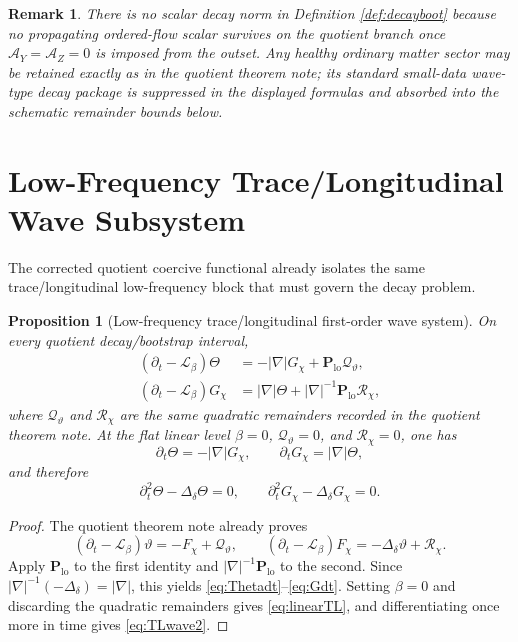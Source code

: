 \documentclass[11pt]{article}
\newcommand{\Ell}{\mathcal{L}}
\newcommand{\AY}{\mathcal A_Y}
\newcommand{\AZ}{\mathcal A_Z}
\newtheorem{proposition}{Proposition}
\newtheorem{remark}{Remark}
\begin{document}
\begin{remark}
There is no scalar decay norm in Definition \ref{def:decayboot} because no propagating ordered-flow scalar survives on the quotient branch once \(\AY=\AZ=0\) is imposed from the outset. Any healthy ordinary matter sector may be retained exactly as in the quotient theorem note; its standard small-data wave-type decay package is suppressed in the displayed formulas and absorbed into the schematic remainder bounds below.
\end{remark}

\section{Low-Frequency Trace/Longitudinal Wave Subsystem}

The corrected quotient coercive functional already isolates the same trace/longitudinal low-frequency block that must govern the decay problem.

\begin{proposition}[Low-frequency trace/longitudinal first-order wave system]
\label{prop:TLwave}
On every quotient decay/bootstrap interval,
\begin{align}
(\partial_t-\Ell_\beta)\Theta
&=
-|\nabla|G_\chi + \mathbf P_{\mathrm{lo}}\mathcal Q_\vartheta,
\label{eq:Thetadt}
\\
(\partial_t-\Ell_\beta)G_\chi
&=
|\nabla|\Theta + |\nabla|^{-1}\mathbf P_{\mathrm{lo}}\mathcal R_\chi,
\label{eq:Gdt}
\end{align}
where \(\mathcal Q_\vartheta\) and \(\mathcal R_\chi\) are the same quadratic remainders recorded in the quotient theorem note. At the flat linear level \(\beta=0\), \(\mathcal Q_\vartheta=0\), and \(\mathcal R_\chi=0\), one has
\begin{equation}
\partial_t\Theta=-|\nabla|G_\chi,
\qquad
\partial_tG_\chi=|\nabla|\Theta,
\label{eq:linearTL}
\end{equation}
and therefore
\begin{equation}
\partial_t^2\Theta-\Delta_\delta\Theta=0,
\qquad
\partial_t^2G_\chi-\Delta_\delta G_\chi=0.
\label{eq:TLwave2}
\end{equation}
\end{proposition}

\begin{proof}
The quotient theorem note already proves
\[
(\partial_t-\Ell_\beta)\vartheta=-F_\chi+\mathcal Q_\vartheta,
\qquad
(\partial_t-\Ell_\beta)F_\chi=-\Delta_\delta\vartheta+\mathcal R_\chi.
\]
Apply \(\mathbf P_{\mathrm{lo}}\) to the first identity and \(|\nabla|^{-1}\mathbf P_{\mathrm{lo}}\) to the second. Since \(|\nabla|^{-1}(-\Delta_\delta)=|\nabla|\), this yields \eqref{eq:Thetadt}--\eqref{eq:Gdt}. Setting \(\beta=0\) and discarding the quadratic remainders gives \eqref{eq:linearTL}, and differentiating once more in time gives \eqref{eq:TLwave2}.
\end{proof}
\end{document}
